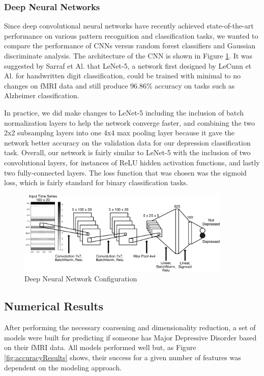 \documentclass{article}[12pt]
\begin{document}
   \subsubsection{Deep Neural Networks}
   Since deep convolutional neural networks have recently achieved state-of-the-art performance on various pattern recognition and classification tasks, we wanted to compare the performance of CNNs versus random forest classifiers and Gaussian discriminate analysis. The architecture of the CNN is shown in Figure \ref{fig:dnnConfig}.  It was suggested by Sarraf et Al. \cite{sarraf2016fmri} that LeNet-5, a network first designed by LeCunn et Al. \cite{lecun1998gradient} for handwritten digit classification, could be trained with minimal to no changes on fMRI data and still produce 96.86\% accuracy on tasks such as Alzheimer classification. 
   
   In practice, we did make changes to LeNet-5 including the inclusion of batch normalization layers to help the network converge faster, and combining the two 2x2 subsamplng layers into one 4x4 max pooling layer because it gave the network better accuracy on the validation data for our depression classification task. Overall, our network is fairly similar to LeNet-5 with the inclusion of two convolutional layers, for instances of ReLU hidden activation functions, and lastly two fully-connected layers. The loss function that was chosen was the sigmoid loss, which is fairly standard for binary classification tasks.  
   
   \begin{figure}[!htb]
   	\centering
   	\includegraphics[width=4in]{DNN_diagram_annotated.pdf}
   	\caption{Deep Neural Network Configuration}
   	\label{fig:dnnConfig}
   \end{figure}
   
   
   \subsection{Numerical Results}
   After performing the necessary coarsening and dimensionality reduction, a set of models were built for predicting if someone has Major Depressive Disorder based on their fMRI data.  All models performed well but, as Figure \ref{fig:accuracyResults} shows, their success for a given number of features was dependent on the modeling approach. 
   
\end{document}
